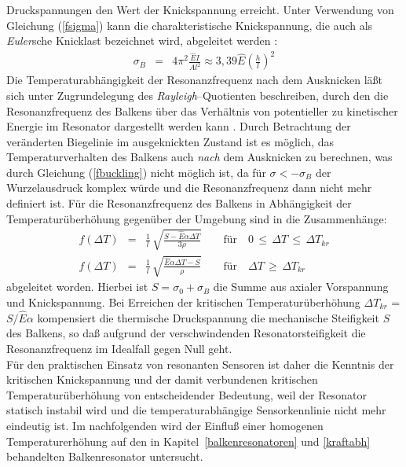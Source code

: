 Druckspannungen den Wert der Knickspannung erreicht. Unter Verwendung von
Gleichung
(\ref{fsigma}) kann die charakteristische Knickspannung, die auch als
{\sl Euler}sche Knicklast bezeichnet wird, abgeleitet werden \cite{Tim87}:
\begin{eqnarray}
\label{sigmab}
 \sigma_{B} & = & 4 {\pi}^2 \frac{\hat E I}{A{l}^2}
     \approx 3,39 \hat E {\left( \frac{h}{l} \right) }^2
\end{eqnarray}
Die Temperaturabhängigkeit der Resonanzfrequenz nach dem Ausknicken
läßt sich unter Zugrundelegung des {\sl Rayleigh}--Quotienten beschreiben,
durch den die Resonanzfrequenz des Balkens über das Verhältnis von
potentieller zu kinetischer Energie im Resonator dargestellt werden kann
\cite{Kim86, Gei91}. Durch Betrachtung der veränderten Biegelinie im
ausgeknickten Zustand ist es möglich, das Temperaturverhalten
des Balkens auch {\em nach} dem Ausknicken zu berechnen, was durch
Gleichung (\ref{fbuckling}) nicht möglich ist, da für
$\sigma < - \sigma_{B}$ der Wurzelausdruck komplex würde und die
Resonanzfrequenz dann nicht mehr definiert ist.
Für die Resonanzfrequenz des Balkens in Abhängigkeit der
Temperaturüberhöhung gegenüber der Umgebung sind in \cite{Bar93} die
Zusammenhänge:
\begin{eqnarray}
\label{fdeltat1}
 f(\Delta T) & = & \frac{1}{l} \, \sqrt{\frac{ S - \hat E \alpha \Delta T}
     {3 \rho}} \qquad \mbox{für} \quad 0 \, \leq \, \Delta T \, \leq \, \Delta T_{kr} \\
\label{fdeltat2}
 f(\Delta T) & = & \frac{1}{l} \, \sqrt{\frac{\hat E \alpha \Delta T - S}
     {\rho}} \qquad \mbox{für} \quad \Delta T \, \geq \, \Delta T_{kr}
\end{eqnarray}
abgeleitet worden. Hierbei ist $S=\sigma_{0}+\sigma_{B}$ die Summe aus
axialer Vorspannung und Knickspannung. Bei Erreichen der kritischen
Temperaturüberhöhung $\Delta T_{kr}$ = $S/{\hat E \alpha}$ kompensiert die
thermische Druckspannung
die mechanische Steifigkeit $S$ des Balkens, so daß aufgrund der
verschwindenden Resonatorsteifigkeit die Resonanzfrequenz im Idealfall
gegen Null geht. \\
Für den praktischen Einsatz von resonanten Sensoren ist daher die Kenntnis
der kritischen Knickspannung
und der damit verbundenen kritischen Temperaturüberhöhung von
entscheidender Bedeutung, weil der Resonator statisch instabil wird und
die temperaturabhängige Sensorkennlinie nicht mehr eindeutig ist.
Im nachfolgenden wird der Einfluß einer homogenen Temperaturerhöhung auf
den in Kapitel~\ref{balkenresonatoren} und \ref{kraftabh} behandelten
Balkenresonator untersucht.


